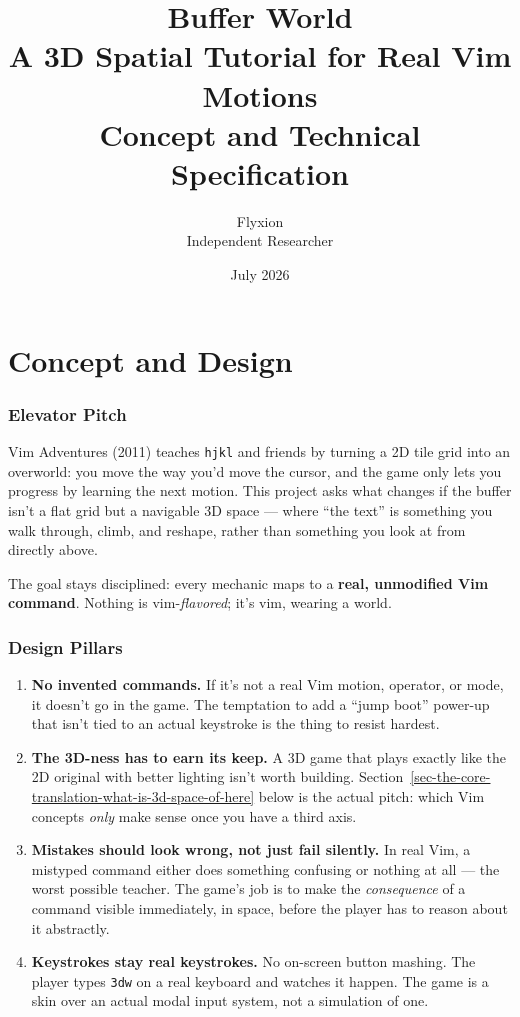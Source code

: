 \documentclass[11pt]{article}
\title{\textbf{Buffer World}\\
\large A 3D Spatial Tutorial for Real Vim Motions\\
\normalsize Concept and Technical Specification}
\author{Flyxion\\\small Independent Researcher}
\date{July 2026}
\providecommand{\tightlist}{%
  \setlength{\itemsep}{0pt}\setlength{\parskip}{0pt}}
\begin{document}
\maketitle
\thispagestyle{empty}
\newpage

\tableofcontents
\newpage

\part{Concept and Design}

\hypertarget{sec-elevator-pitch}{%
\section{Elevator Pitch}\label{sec-elevator-pitch}}

Vim Adventures (2011) teaches \texttt{hjkl} and friends by turning a 2D tile grid into an
overworld: you move the way you'd move the cursor, and the game only lets you
progress by learning the next motion. This project asks what changes if the
buffer isn't a flat grid but a navigable 3D space --- where ``the text'' is
something you walk through, climb, and reshape, rather than something you look
at from directly above.

The goal stays disciplined: every mechanic maps to a \textbf{real, unmodified Vim
command}. Nothing is vim-\emph{flavored}; it's vim, wearing a world.

\hypertarget{sec-design-pillars}{%
\section{Design Pillars}\label{sec-design-pillars}}

\begin{enumerate}
\def\labelenumi{\arabic{enumi}.}
\tightlist
\item
  \textbf{No invented commands.} If it's not a real Vim motion, operator, or mode,
  it doesn't go in the game. The temptation to add a ``jump boot'' power-up that
  isn't tied to an actual keystroke is the thing to resist hardest.
\item
  \textbf{The 3D-ness has to earn its keep.} A 3D game that plays exactly like the
  2D original with better lighting isn't worth building. Section~\ref{sec-the-core-translation-what-is-3d-space-of-here} below is
  the actual pitch: which Vim concepts \emph{only} make sense once you have a third
  axis.
\item
  \textbf{Mistakes should look wrong, not just fail silently.} In real Vim, a
  mistyped command either does something confusing or nothing at all --- the
  worst possible teacher. The game's job is to make the \emph{consequence} of a
  command visible immediately, in space, before the player has to reason
  about it abstractly.
\item
  \textbf{Keystrokes stay real keystrokes.} No on-screen button mashing. The player
  types \texttt{3dw} on a real keyboard and watches it happen. The game is a skin
  over an actual modal input system, not a simulation of one.
\end{enumerate}
\end{document}
